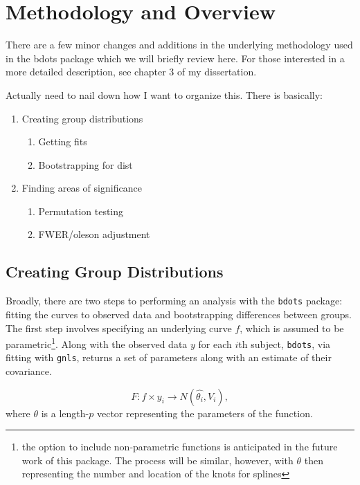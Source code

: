 \documentclass{article}
\newcommand{\xt}{\texttt}%
\begin{document}

\section{Methodology and Overview} 

There are a few minor changes and additions in the underlying methodology used in the bdots package which we will briefly review here. For those interested in a more detailed description, see chapter 3 of my dissertation.

Actually need to nail down how I want to organize this. There is basically:

\begin{enumerate}
\item Creating group distributions
\begin{enumerate}
\item Getting fits
\item Bootstrapping for dist
\end{enumerate}
\item Finding areas of significance
\begin{enumerate}
\item Permutation testing
\item FWER/oleson adjustment
\end{enumerate}
\end{enumerate}

\subsection{Creating Group Distributions}


Broadly, there are two steps to performing an analysis with the \xt{bdots} package: fitting the curves to observed data and bootstrapping differences between groups. The first step involves specifying an underlying curve $f$, which is assumed to be parametric\footnote{the option to include non-parametric functions is anticipated in the future work of this package. The process will be similar, however, with $\theta$ then representing the number and location of the knots for splines}. Along with the observed data $y$ for each $i$th subject, \xt{bdots}, via fitting with \xt{gnls}, returns a set of parameters along with an estimate of their covariance.

\begin{equation}
F: f \times y_i \rightarrow N(\hat{\theta_i}, V_{i}),
\end{equation}
where $\theta$ is a length-$p$ vector representing the parameters of the function.
\end{document}
